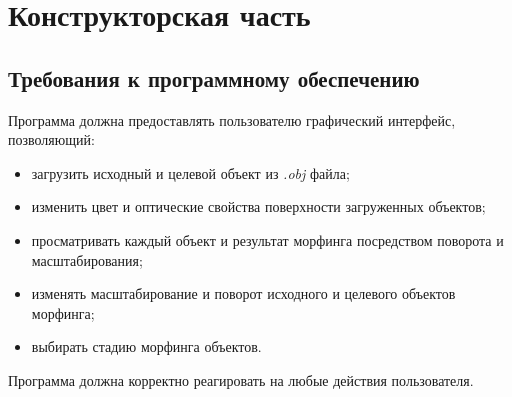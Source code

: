 \chapter{Конструкторская часть}


\section{Требования к программному обеспечению}
Программа должна предоставлять пользователю графический интерфейс, позволяющий:
\begin{itemize}
    \item загрузить исходный и целевой объект из \textit{.obj} файла;
    \item изменить цвет и оптические свойства поверхности загруженных объектов;
    \item просматривать каждый объект и результат морфинга посредством поворота и масштабирования;
    \item изменять масштабирование и поворот исходного и целевого объектов морфинга;
    \item выбирать стадию морфинга объектов.
\end{itemize}

Программа должна корректно реагировать на любые действия пользователя.

